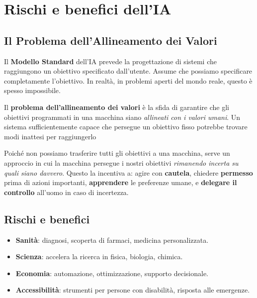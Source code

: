 \section{Rischi e benefici dell'IA}


\subsection{Il Problema dell'Allineamento dei Valori}

\begin{defbox}
Il \textbf{Modello Standard} dell'IA prevede la progettazione di sistemi che raggiungono un obiettivo specificato dall'utente. Assume che possiamo specificare completamente l'obiettivo. In realt\`a, in problemi aperti del mondo reale, questo \`e spesso impossibile.
\end{defbox}

\begin{warnbox}
Il \textbf{problema dell'allineamento dei valori} \`e la sfida di garantire che gli obiettivi programmati in una macchina siano \emph{allineati con i valori umani}. Un sistema sufficientemente capace che persegue un obiettivo fisso potrebbe trovare modi inattesi per raggiungerlo
\end{warnbox}

\begin{thmbox}
Poich\'e non possiamo trasferire tutti gli obiettivi a una macchina, serve un approccio in cui la macchina persegue i nostri obiettivi \emph{rimanendo incerta su quali siano davvero}. Questo la incentiva a: agire con \textbf{cautela}, chiedere \textbf{permesso} prima di azioni importanti, \textbf{apprendere} le preferenze umane, e \textbf{delegare il controllo} all'uomo in caso di incertezza.
\end{thmbox}

\subsection{Rischi e benefici}

\begin{exbox}
\begin{itemize}
    \item \textbf{Sanit\`a}: diagnosi, scoperta di farmaci, medicina personalizzata.
    \item \textbf{Scienza}: accelera la ricerca in fisica, biologia, chimica.
    \item \textbf{Economia}: automazione, ottimizzazione, supporto decisionale.
    \item \textbf{Accessibilit\`a}: strumenti per persone con disabilit\`a, risposta alle emergenze.
\end{itemize}
\end{exbox}

